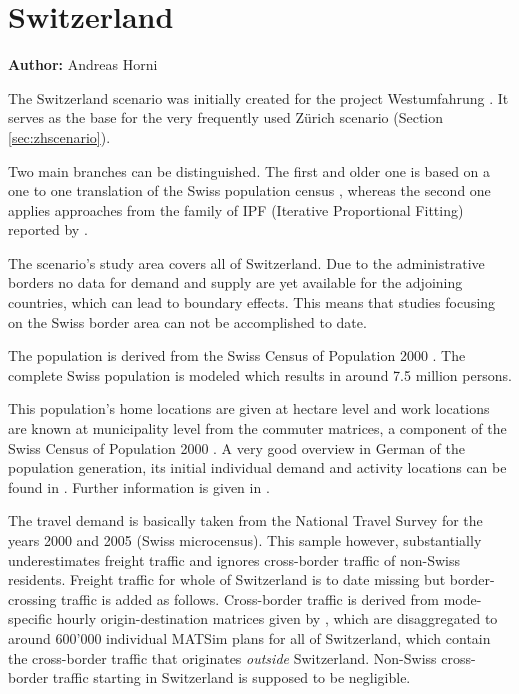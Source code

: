 \section{Switzerland}
\hfill \textbf{Author:} Andreas Horni

The Switzerland scenario was initially created for the project Westumfahrung \citep[][]{BalmerEtAl_ResRep_bdktzrh_2009}. It serves as the base for the very frequently used Zürich scenario (Section \ref{sec:zhscenario}). 

Two main branches can be distinguished. The first and older one is based on a one to one translation of the Swiss population census \citep[][]{BfS_VZ_2000}, whereas the second one applies approaches from the family of IPF (Iterative Proportional Fitting) reported by \citet[][]{MuellerKAxhausen_TechRep_IVT_2013, Mueller_unpub_LATSIS_2012, Mueller_unpub_ETC_2011, Mueller_unpub_STRC_2011, Mueller_unpub_IATBR_2012}.

The scenario's study area covers all of Switzerland. Due to the administrative borders no data for demand and supply are yet available for the adjoining countries, which can lead to boundary effects. This means that studies focusing on the Swiss border area can not be accomplished to date.

The population is derived from the Swiss Census of Population 2000 \citep[][]{BfS_VZ_2000}. The complete Swiss population is modeled which results in around 7.5 million persons. 

This population's home locations are given at hectare level and work locations are known at municipality level from the commuter matrices, a component of the Swiss Census of Population 2000 \citep[][p.35]{BalmerEtAl_ResRep_bdktzrh_2009}. A very good overview in German of the population generation, its initial individual demand and activity locations can be found in \citet{MeisterEtAl_SVT_2009}. Further information is given in \citet[][]{CiariEtAl_STRC_2008, MeisterEtAl_WCTRS_2010, BalmerEtAl_ResRep_bdktzrh_2009, BalmerEtAl_ResRep_datapuls_2010, BalmerEtAl_HEUREKA_2008}.

The travel demand is basically taken from the National Travel Survey for the years 2000 and 2005 \citep[][]{BfS-MZ2005_manual_2006} (Swiss microcensus). This sample however, substantially underestimates freight traffic and ignores cross-border traffic of non-Swiss residents. Freight traffic for whole of Switzerland is to date missing but border-crossing traffic is added as follows. Cross-border traffic is derived from mode-specific hourly origin-destination matrices given by \citet[][]{VrticEtAl_ResRep_UVEK_2007}, which are disaggregated to around 600'000 individual MATSim plans for all of Switzerland, which contain the cross-border traffic that originates \emph{outside} Switzerland. Non-Swiss cross-border traffic starting in Switzerland is supposed to be negligible. 

